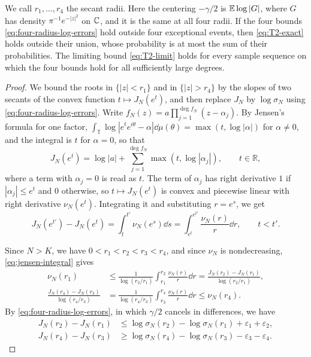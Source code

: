 We call $r_1,\dots,r_4$ the secant radii. Here the centering $-\gamma/2$ is $\mathbb E\log|G|$, where $G$ has density
$\pi^{-1}e^{-|z|^2}$ on $\mathbb C$, and it is the same at all four radii.
If the four bounds \eqref{eq:four-radius-log-errors} hold outside four
exceptional events, then \eqref{eq:T2-exact} holds outside their union,
whose probability is at most the sum of their probabilities.
The limiting bound \eqref{eq:T2-limit} holds for every sample sequence on
which the four bounds hold for all sufficiently large degrees.

\begin{proof}
We bound the roots in $\{|z|<r_1\}$ and in $\{|z|>r_4\}$ by the slopes
of two secants of the convex function $t\mapsto J_N(e^t)$, and then
replace $J_N$ by $\log\sigma_N$ using \eqref{eq:four-radius-log-errors}.
Write $f_N(z)=a\prod_{j=1}^{\deg f_N}(z-\alpha_j)$.
By Jensen's formula \cite[\S3.61]{Titchmarsh1939} for one factor,
$\int_{\mathbb T}\log|e^te^{i\theta}-\alpha|\dd\mu(\theta)=\max(t,\log|\alpha|)$
for $\alpha\ne0$, and the integral is $t$ for $\alpha=0$, so that
\[
 J_N(e^t)=\log|a|+\sum_{j=1}^{\deg f_N}\max(t,\log|\alpha_j|),
 \qquad t\in\mathbb R,
\]
where a term with $\alpha_j=0$ is read as $t$. The term of $\alpha_j$ has
right derivative $1$ if $|\alpha_j|\le e^t$ and $0$ otherwise, so
$t\mapsto J_N(e^t)$ is convex and piecewise linear with right derivative
$\nu_N(e^t)$. Integrating it and substituting $r=e^s$, we get
\begin{equation}
 J_N(e^{t'})-J_N(e^t)=\int_t^{t'}\nu_N(e^s)\dd s
 =\int_{e^t}^{e^{t'}}\frac{\nu_N(r)}r\dd r,\qquad t<t'.
 \label{eq:jensen-integral}
\end{equation}

Since $N>K$, we have $0<r_1<r_2<r_3<r_4$, and since $\nu_N$ is
nondecreasing, \eqref{eq:jensen-integral} gives
\begin{align*}
 \nu_N(r_1)
 &\leq\frac1{\log(r_2/r_1)}\int_{r_1}^{r_2}\frac{\nu_N(r)}r\dd r
 =\frac{J_N(r_2)-J_N(r_1)}{\log(r_2/r_1)},\\
 \frac{J_N(r_4)-J_N(r_3)}{\log(r_4/r_3)}
 &=\frac1{\log(r_4/r_3)}\int_{r_3}^{r_4}\frac{\nu_N(r)}r\dd r
 \leq\nu_N(r_4).
\end{align*}
By \eqref{eq:four-radius-log-errors}, in which $\gamma/2$ cancels in
differences, we have
\begin{align*}
 J_N(r_2)-J_N(r_1)
 &\leq\log\sigma_N(r_2)-\log\sigma_N(r_1)+\varepsilon_1+\varepsilon_2,\\
 J_N(r_4)-J_N(r_3)
 &\geq\log\sigma_N(r_4)-\log\sigma_N(r_3)-\varepsilon_3-\varepsilon_4.
\end{align*}


\end{proof}
